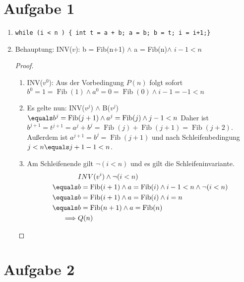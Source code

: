 \documentclass{article}
\newcommand{\Fib}{\operatorname{Fib}}
\begin{document}
	\section*{Aufgabe 1}
	\begin{enumerate}
		\item \lstinline|while (i < n ) { int t = a + b; a = b; b = t; i = i+1;}|
		\item Behauptung: INV($v$): b = Fib(n+1) $\land$ a = Fib(n)$\land$ $i-1 < n$
		\begin{proof}
			\begin{enumerate}
				\item INV($v^0$): Aus der Vorbedingung $P(n)$ folgt sofort $b^0 = 1 = \Fib(1)\land a^0 = 0 = \Fib(0) \land i-1 = -1 < n$
				\item Es gelte nun: INV($v^j$) $\land$ B($v^j$)
				$\equals b^j = \Fib(j+1) \land a^j = \Fib(j) \land j-1< n$
				Daher ist $b^{j+1} = t^{j+1} = a^j + b^j = \Fib(j) + \Fib(j+1) = \Fib(j+2)$.
				Außerdem ist $a^{j+1} = b^{j} = \Fib(j+1)$ und nach Schleifenbedingung $j <n \equals j + 1-1 < n$.
				\item Am Schleifenende gilt $\neg (i < n)$ und es gilt die Schleifeninvariante.
				\begin{align*}
					&INV(v^i) \land \neg (i < n)\\
					\equals&b = \Fib(i+1)\land a = \Fib(i) \land i-1 < n \land \neg (i < n)\\
					\equals&b = \Fib(i+1)\land a = \Fib(i) \land i = n\\
					\equals&b = \Fib(n+1)\land a = \Fib(n)\\
					\implies&Q(n)
				\end{align*}
			\end{enumerate}
		\end{proof}
	\end{enumerate}
	\section*{Aufgabe 2}
\end{document}

